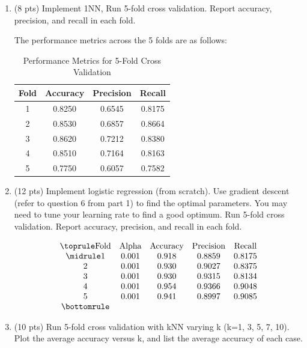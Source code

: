 \documentclass[a4paper]{article}
\theoremstyle{definition}
\newenvironment{soln}{
    \leavevmode\color{blue}\ignorespaces
}{}
\begin{document}
\begin{enumerate}
	\item (8 pts) Implement 1NN, Run 5-fold cross validation. Report accuracy, precision, and recall in each fold.
	
	\begin{soln}  The performance metrics across the 5 folds are as follows:

		\begin{table}[h]
			\centering
			\begin{tabular}{cccc}
				\toprule
				Fold & Accuracy & Precision & Recall \\
				\midrule
				1 & 0.8250 & 0.6545 & 0.8175 \\
				2 & 0.8530 & 0.6857 & 0.8664 \\
				3 & 0.8620 & 0.7212 & 0.8380 \\
				4 & 0.8510 & 0.7164 & 0.8163 \\
				5 & 0.7750 & 0.6057 & 0.7582 \\
				\bottomrule
			\end{tabular}
			\caption{Performance Metrics for 5-Fold Cross Validation}
			\label{tab:results}
		\end{table}
	\end{soln}
	
	\item (12 pts) Implement logistic regression (from scratch). Use gradient descent (refer to question 6 from part 1) to find the optimal parameters. You may need to tune your learning rate to find a good optimum. Run 5-fold cross validation. Report accuracy, precision, and recall in each fold.
	
	\begin{soln}  \[
		\begin{array}{ccccc}
		\toprule
		\text{Fold} & \text{Alpha} & \text{Accuracy} & \text{Precision} & \text{Recall} \\
		\midrule
		1 & 0.001 & 0.918 & 0.8859 & 0.8175 \\
		2 & 0.001 & 0.930 & 0.9027 & 0.8375 \\
		3 & 0.001 & 0.930 & 0.9315 & 0.8134 \\
		4 & 0.001 & 0.954 & 0.9366 & 0.9048 \\
		5 & 0.001 & 0.941 & 0.8997 & 0.9085 \\
		\bottomrule
		\end{array}
		\]
	\end{soln}
	
	\item (10 pts) Run 5-fold cross validation with kNN varying k (k=1, 3, 5, 7, 10). Plot the average accuracy versus k, and list the average accuracy of each case. \\
	

\end{enumerate}
\end{document}
